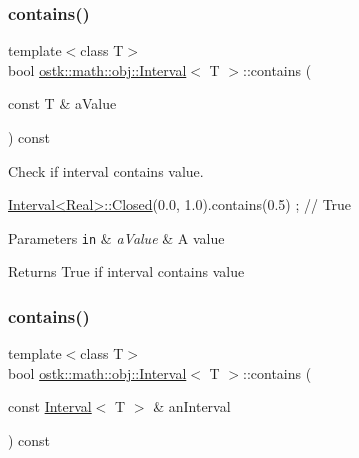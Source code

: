 \subsubsection{\texorpdfstring{contains()}{contains()}\hspace{0.1cm}{\footnotesize\ttfamily [1/2]}}
{\footnotesize\ttfamily template$<$class T$>$ \\
bool \hyperlink{classostk_1_1math_1_1obj_1_1_interval}{ostk\+::math\+::obj\+::\+Interval}$<$ T $>$\+::contains (\begin{DoxyParamCaption}\item[{const T \&}]{a\+Value }\end{DoxyParamCaption}) const}



Check if interval contains value. 


\begin{DoxyCode}
\hyperlink{classostk_1_1math_1_1obj_1_1_interval_a48e9f436e8994c49026a1ecd503bc190}{Interval<Real>::Closed}(0.0, 1.0).contains(0.5) ; \textcolor{comment}{// True}
\end{DoxyCode}



\begin{DoxyParams}[1]{Parameters}
\mbox{\tt in}  & {\em a\+Value} & A value \\
\hline
\end{DoxyParams}
\begin{DoxyReturn}{Returns}
True if interval contains value 
\end{DoxyReturn}
\mbox{\label{classostk_1_1math_1_1obj_1_1_interval_ad7d805288e161a123593991f90c437ff}} 
\subsubsection{\texorpdfstring{contains()}{contains()}\hspace{0.1cm}{\footnotesize\ttfamily [2/2]}}
{\footnotesize\ttfamily template$<$class T$>$ \\
bool \hyperlink{classostk_1_1math_1_1obj_1_1_interval}{ostk\+::math\+::obj\+::\+Interval}$<$ T $>$\+::contains (\begin{DoxyParamCaption}\item[{const \hyperlink{classostk_1_1math_1_1obj_1_1_interval}{Interval}$<$ T $>$ \&}]{an\+Interval }\end{DoxyParamCaption}) const}



